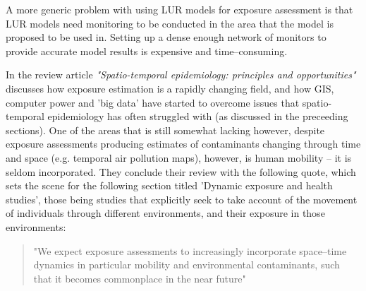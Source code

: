 A more generic problem with using LUR models for exposure assessment is that LUR models need monitoring to be conducted in the area that the model is proposed to be used in. Setting up a dense enough network of monitors to provide accurate model results is expensive and time--consuming.

\vspace{1cm}

In the review article \textit{"Spatio-temporal epidemiology: principles and opportunities"} \cite{Meliker2011} discusses how exposure estimation is a rapidly changing field, and how GIS, computer power and 'big data' have started to overcome issues that spatio-temporal epidemiology has often struggled with (as discussed in the preceeding sections). One of the areas that is still somewhat lacking however, despite exposure assessments producing estimates of contaminants changing through time and space (e.g. temporal air pollution maps), however, is human mobility -- it is seldom incorporated. They conclude their review with the following quote, which sets the scene for the following section titled 'Dynamic exposure and health studies', those being studies that explicitly seek to take account of the movement of individuals through different environments, and their exposure in those environments:

\begin{quote}
"We expect exposure assessments to increasingly incorporate space--time dynamics in particular mobility and environmental contaminants, such that it becomes commonplace in the near future" \cite{Meliker2011}
\end{quote}